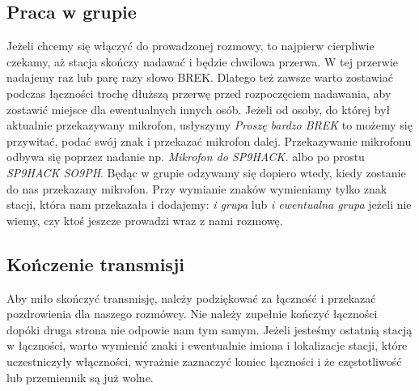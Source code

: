 \documentclass[a4paper,11pt]{article}
\begin{document}
\subsection{Praca w grupie}
Jeżeli chcemy się włączyć do prowadzonej rozmowy, to najpierw cierpliwie czekamy, aż stacja skończy nadawać i będzie chwilowa przerwa. W tej przerwie nadajemy raz lub parę razy słowo BREK. Dlatego też zawsze warto zostawiać podczas łączności trochę dłuższą przerwę przed rozpoczęciem nadawania, aby zostawić miejsce dla ewentualnych innych osób. Jeżeli od osoby, do której był aktualnie przekazywany mikrofon, usłyszymy \textit{Proszę bardzo BREK} to możemy się przywitać, podać swój znak i przekazać mikrofon dalej. Przekazywanie mikrofonu odbywa się poprzez nadanie np. \textit{Mikrofon do SP9HACK.} albo po prostu \textit{SP9HACK SO9PH}. Będąc w grupie odzywamy się dopiero wtedy, kiedy zostanie do nas przekazany mikrofon. Przy wymianie znaków wymieniamy tylko znak stacji, która nam przekazała i dodajemy: \textit{i grupa} lub \textit{i ewentualna grupa} jeżeli nie wiemy, czy ktoś jeszcze prowadzi wraz z nami rozmowę.
\subsection{Kończenie transmisji}
Aby miło skończyć transmisję, należy podziękować za łączność i przekazać pozdrowienia dla naszego rozmówcy. Nie należy zupełnie kończyć łączności dopóki druga strona nie odpowie nam tym samym. Jeżeli jesteśmy ostatnią stacją w łączności, warto wymienić znaki i ewentualnie imiona i lokalizacje stacji, które uczestniczyły włączności, wyrażnie zaznaczyć koniec łączności i że częstotliwość lub przemiennik są już wolne.
\end{document}
